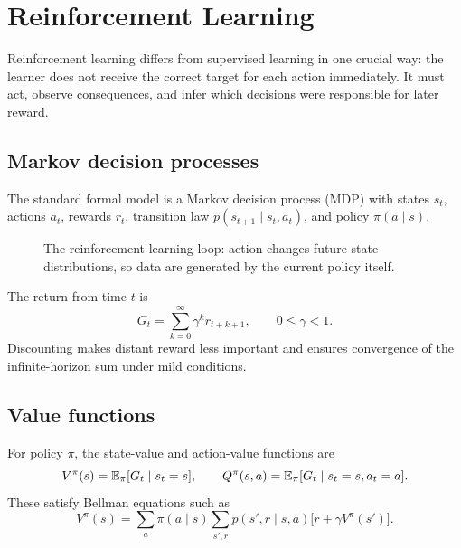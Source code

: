 \chapter{Reinforcement Learning}

Reinforcement learning differs from supervised learning in one crucial way: the learner does not receive the correct target for each action immediately. It must act, observe consequences, and infer which decisions were responsible for later reward.

\section{Markov decision processes}

The standard formal model is a Markov decision process (MDP) with states $s_t$, actions $a_t$, rewards $r_t$, transition law $p(s_{t+1}\mid s_t,a_t)$, and policy $\pi(a\mid s)$.

\begin{figure}[t]
\centering
{}
\caption{The reinforcement-learning loop: action changes future state distributions, so data are generated by the current policy itself.}
\end{figure}

The return from time $t$ is
\[
  G_t = \sum_{k=0}^{\infty} \gamma^k r_{t+k+1},
  \qquad 0 \le \gamma < 1.
\]
Discounting makes distant reward less important and ensures convergence of the infinite-horizon sum under mild conditions.

\section{Value functions}

For policy $\pi$, the state-value and action-value functions are
\[
  V^\pi(s) = \mathbb{E}_\pi[G_t \mid s_t=s],
  \qquad
  Q^\pi(s,a) = \mathbb{E}_\pi[G_t \mid s_t=s, a_t=a].
\]
These satisfy Bellman equations such as
\[
  V^\pi(s)
  =
  \sum_a \pi(a \mid s)
  \sum_{s',r}
  p(s',r \mid s,a)
  \bigl[r + \gamma V^\pi(s')\bigr].
\]

